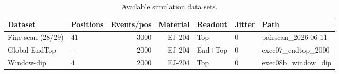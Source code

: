 \begin{table}[htbp]
\centering
\small
\caption{Available simulation data sets.}
\label{tab:datasets}
\begin{tabular}{llrrllp{3cm}}
\toprule
\textbf{Dataset} & \textbf{Positions} & \textbf{Events/pos} & \textbf{Material} & \textbf{Readout} & \textbf{Jitter} & \textbf{Path} \\
\midrule
Fine scan (28/29) & 41 & 3000 & EJ-204 & Top & 0 & pairscan\_2026-06-11 \\
Global EndTop & -- & 2000 & EJ-204 & End+Top & 0 & exec07\_endtop\_2000 \\
Window-dip & 4 & ~2000 & EJ-204 & Top & 0 & exec08b\_window\_dip \\
\bottomrule
\end{tabular}
\end{table}
